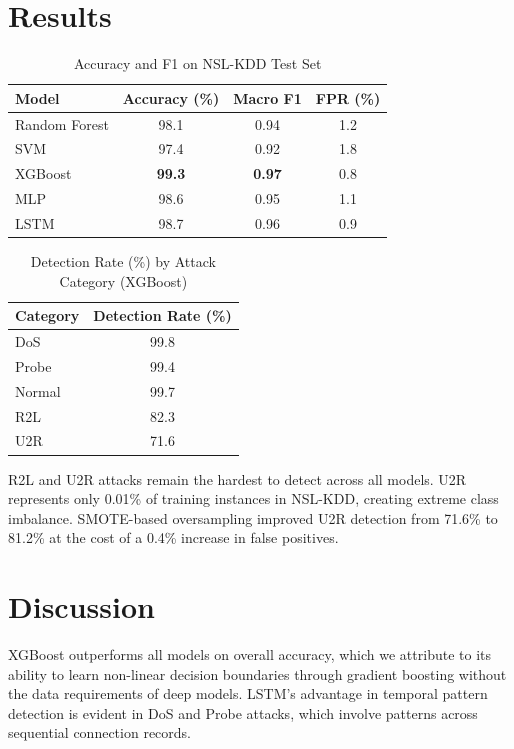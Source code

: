 \documentclass[conference]{IEEEtran}
\begin{document}
\section{Results}

\begin{table}[htbp]
\caption{Accuracy and F1 on NSL-KDD Test Set}
\begin{center}
\begin{tabular}{|l|c|c|c|}
\hline
\textbf{Model} & \textbf{Accuracy (\%)} & \textbf{Macro F1} & \textbf{FPR (\%)} \\
\hline
Random Forest & 98.1 & 0.94 & 1.2 \\
SVM & 97.4 & 0.92 & 1.8 \\
XGBoost & \textbf{99.3} & \textbf{0.97} & 0.8 \\
MLP & 98.6 & 0.95 & 1.1 \\
LSTM & 98.7 & 0.96 & 0.9 \\
\hline
\end{tabular}
\label{tab:results}
\end{center}
\end{table}

\begin{table}[htbp]
\caption{Detection Rate (\%) by Attack Category (XGBoost)}
\begin{center}
\begin{tabular}{|l|c|}
\hline
\textbf{Category} & \textbf{Detection Rate (\%)} \\
\hline
DoS & 99.8 \\
Probe & 99.4 \\
Normal & 99.7 \\
R2L & 82.3 \\
U2R & 71.6 \\
\hline
\end{tabular}
\label{tab:per_class}
\end{center}
\end{table}

R2L and U2R attacks remain the hardest to detect across all models. U2R represents only 0.01\% of training instances in NSL-KDD, creating extreme class imbalance. SMOTE-based oversampling improved U2R detection from 71.6\% to 81.2\% at the cost of a 0.4\% increase in false positives.

\section{Discussion}

XGBoost outperforms all models on overall accuracy, which we attribute to its ability to learn non-linear decision boundaries through gradient boosting without the data requirements of deep models. LSTM's advantage in temporal pattern detection is evident in DoS and Probe attacks, which involve patterns across sequential connection records.
\end{document}
